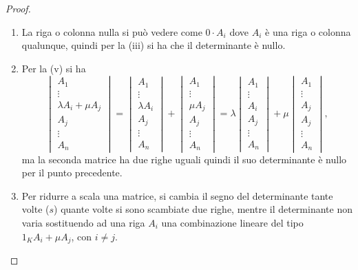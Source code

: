 \begin{proof}
	\begin{enumerate}
	\item La riga o colonna nulla si può vedere come $0\cdot A_i$ dove $A_i$ è una riga o colonna qualunque, quindi per la (iii) si ha che il determinante è nullo.
	\item Per la (v) si ha
		\begin{equation*}
			\begin{vmatrix}
				A_1\\\vdots\\\lambda A_i+\mu A_j\\ A_j\\\vdots\\A_n
			\end{vmatrix}
			=
			\begin{vmatrix}
				A_1\\\vdots\\\lambda A_i\\ A_j\\\vdots\\A_n
			\end{vmatrix}
			+
			\begin{vmatrix}
				A_1\\\vdots\\\mu A_j\\ A_j\\\vdots\\A_n
			\end{vmatrix}
			=\lambda
			\begin{vmatrix}
				A_1\\\vdots\\A_i\\ A_j\\\vdots\\A_n
			\end{vmatrix}
			+\mu
			\begin{vmatrix}
				A_1\\\vdots\\A_j\\ A_j\\\vdots\\A_n
			\end{vmatrix},
		\end{equation*}
		ma la seconda matrice ha due righe uguali quindi il suo determinante è nullo per il punto precedente.
	\item Per ridurre a scala una matrice, si cambia il segno del determinante tante volte ($s$) quante volte si sono scambiate due righe, mentre il determinante non varia sostituendo ad una riga $A_i$ una combinazione lineare del tipo $1_KA_i+\mu A_j$, con $i\neq j$.

\end{enumerate}
\end{proof}
